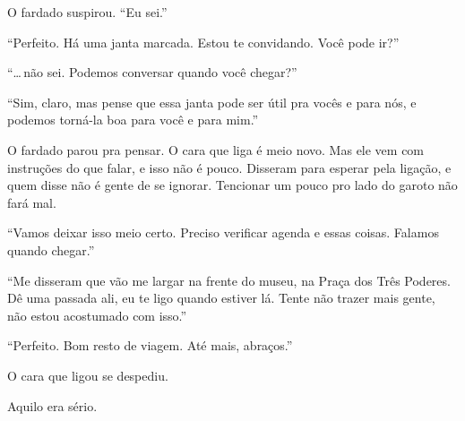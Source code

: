 O fardado suspirou. ``Eu sei.''

``Perfeito. Há uma janta marcada. Estou te convidando. Vo\-cê pode ir?''

``\ldots\,não sei. Podemos conversar quando você chegar?''

``Sim, claro, mas pense que essa janta pode ser útil pra vocês e para nós, e podemos torná-la boa para você e para mim.''

O fardado parou pra pensar. O cara que liga é meio novo. Mas ele vem com instruções do que falar, e isso não é pouco. Disseram para esperar pela ligação, e quem disse não é gente de se ignorar. Tencionar um pouco pro lado do garoto não fará mal.

``Vamos deixar isso meio certo. Preciso verificar agenda e essas coisas. Falamos quando chegar.''

``Me disseram que vão me largar na frente do museu, na Praça dos Três Poderes. Dê uma passada ali, eu te ligo quando estiver lá. Tente não trazer mais gente, não estou acostumado com isso.''

``Perfeito. Bom resto de viagem. Até mais, abraços.''

O cara que ligou se despediu.

Aquilo era sério.

